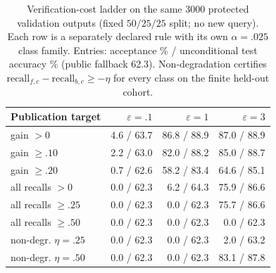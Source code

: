 \begin{table}[t]
\caption{Verification-cost ladder on the same 3000 protected validation outputs (fixed $50/25/25$ split; no new query). Each row is a separately declared rule with its own $\alpha=.025$ class family. Entries: acceptance \% / unconditional test accuracy \% (public fallback 62.3). Non-degradation certifies $\mathrm{recall}_{f,c}-\mathrm{recall}_{b,c}\ge-\eta$ for every class on the finite held-out cohort.}
\label{tab:verify-ladder}\small
\centering
\begin{tabular}{@{}lrrr@{}}\toprule
Publication target & $\varepsilon=.1$ & $\varepsilon=1$ & $\varepsilon=3$ \\
\midrule
gain $>0$ & 4.6 / 63.7 & 86.8 / 88.9 & 87.0 / 88.9 \\
gain $\ge.10$ & 2.2 / 63.0 & 82.0 / 88.2 & 85.0 / 88.7 \\
gain $\ge.20$ & 0.7 / 62.6 & 58.2 / 83.4 & 64.6 / 85.1 \\
all recalls $>0$ & 0.0 / 62.3 & 6.2 / 64.3 & 75.9 / 86.6 \\
all recalls $\ge.25$ & 0.0 / 62.3 & 0.0 / 62.3 & 75.7 / 86.6 \\
all recalls $\ge.50$ & 0.0 / 62.3 & 0.0 / 62.3 & 0.0 / 62.3 \\
non-degr. $\eta=.25$ & 0.0 / 62.3 & 0.0 / 62.3 & 2.0 / 63.2 \\
non-degr. $\eta=.50$ & 0.0 / 62.3 & 0.0 / 62.3 & 83.1 / 87.8 \\
\bottomrule\end{tabular}
\end{table}
